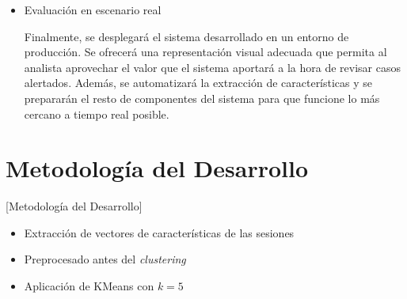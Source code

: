 \begin{itemize}
    \item Evaluación en escenario real

Finalmente, se desplegará el sistema desarrollado en un entorno de producción.
Se ofrecerá una representación visual adecuada que permita al analista aprovechar el valor que el sistema aportará a la hora de revisar casos alertados.
Además, se automatizará la extracción de características y se prepararán el resto de componentes del sistema para que funcione lo más cercano a tiempo real posible.

\end{itemize}

\section{Metodología del Desarrollo}\label{sec:metodologiadesarrollo}

[Metodología del Desarrollo]

\begin{itemize}

    \item Extracción de vectores de características de las sesiones

    \item Preprocesado antes del \emph{clustering}

    \item Aplicación de KMeans con $k=5$

\end{itemize}

